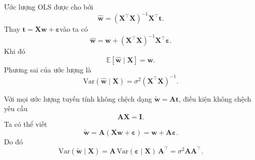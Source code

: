 Ước lượng OLS được cho bởi \begin{equation}
  \hat{\boldsymbol{w}} =
  (\boldsymbol{X}^{\intercal}\boldsymbol{X})^{-1}\boldsymbol{X}^{\intercal}\boldsymbol{t}.
\end{equation} Thay $\boldsymbol{t} = \boldsymbol{X}\boldsymbol{w} +
\boldsymbol{\varepsilon}$vào ta có \begin{equation}
  \hat{\boldsymbol{w}} = \boldsymbol{w} +
  (\boldsymbol{X}^{\intercal}\boldsymbol{X})^{-1}
  \boldsymbol{X}^{\intercal}\boldsymbol{\varepsilon}.
\end{equation} Khi đó \begin{equation}
  \mathbb{E}[\hat{\boldsymbol{w}} \mid \boldsymbol{X}] = \boldsymbol{w}.
\end{equation} Phương sai của ước lượng là \begin{equation}
  \mathrm{Var}(\hat{\boldsymbol{w}} \mid \boldsymbol{X}) = \sigma^2
  (\boldsymbol{X}^{\intercal}\boldsymbol{X})^{-1}.
\end{equation}

Với mọi ước lượng tuyến tính không chệch dạng $\tilde{\boldsymbol{w}} =
\boldsymbol{A}\boldsymbol{t}$, điều kiện không chệch yêu cầu \begin{equation}
  \boldsymbol{A}\boldsymbol{X} = \boldsymbol{I}.
\end{equation} Ta có thể viết \begin{equation}
  \tilde{\boldsymbol{w}} = \boldsymbol{A}(\boldsymbol{X}\boldsymbol{w} +
  \boldsymbol{\varepsilon}) = \boldsymbol{w} +
  \boldsymbol{A}\boldsymbol{\varepsilon}.
\end{equation} Do đó \begin{equation}
  \mathrm{Var}(\tilde{\boldsymbol{w}} \mid \boldsymbol{X}) =
  \boldsymbol{A}\,\mathrm{Var}(\boldsymbol{\varepsilon} \mid
  \boldsymbol{X})\,\boldsymbol{A}^{\intercal} = \sigma^2
  \boldsymbol{A}\boldsymbol{A}^{\intercal}.
\end{equation}

